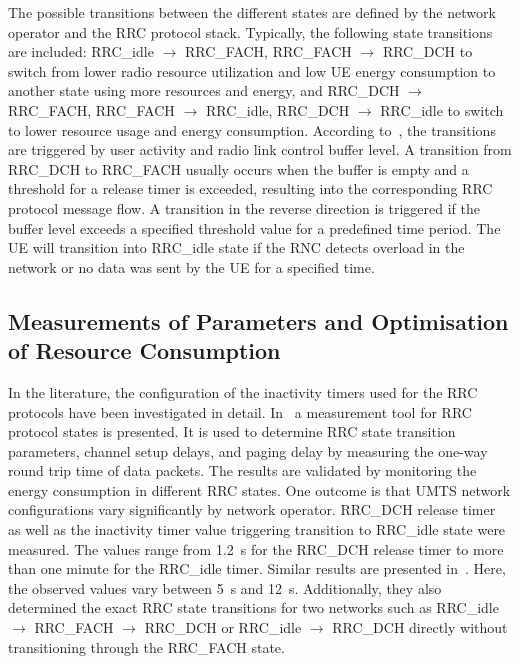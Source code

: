 The possible transitions between the different states are defined by the network operator and the \gls{RRC} protocol stack.
Typically, the following state transitions are included: 
\gls{RRC_idle} \(\rightarrow\) \gls{RRC_FACH},
\gls{RRC_FACH} \(\rightarrow\) \gls{RRC_DCH} to switch from lower radio resource utilization and low \gls{UE} energy consumption to another state using more resources and energy, and 
\gls{RRC_DCH} \(\rightarrow\) \gls{RRC_FACH}, 
\gls{RRC_FACH} \(\rightarrow\) \gls{RRC_idle},
\gls{RRC_DCH} \(\rightarrow\) \gls{RRC_idle} to switch to lower resource usage and energy consumption.
According to~\cite{Perala2009,Qian2010a}, the transitions are triggered by user activity and radio link control buffer level. 
A transition from \gls{RRC_DCH} to \gls{RRC_FACH} usually occurs when the buffer is empty and a threshold for a release timer is exceeded, resulting into the corresponding \gls{RRC} protocol message flow.
A transition in the reverse direction is triggered if the buffer level exceeds a specified threshold value for a predefined time period.
The \gls{UE} will transition into \gls{RRC_idle} state if the \gls{RNC} detects overload in the network or no data was sent by the \gls{UE} for a specified time.

\subsection{Measurements of  Parameters and Optimisation of Resource Consumption}\label{sec:network:background:measurement_optimisation}

In the literature, the configuration of the inactivity timers used for the \gls{RRC} protocols have been investigated in detail.
In~\cite{Perala2009} a measurement tool for \gls{RRC} protocol states is presented. 
It is used to determine \gls{RRC} state transition parameters, channel setup delays, and paging delay by measuring the one-way round trip time of data packets.
The results are validated by monitoring the energy consumption in different \gls{RRC} states.
One outcome is that \gls{UMTS} network configurations vary significantly by network operator.
\gls{RRC_DCH} release timer as well as the inactivity timer value triggering transition to \gls{RRC_idle} state were measured.
The values range from \SI{1.2}{\second} for the \gls{RRC_DCH} release timer to more than one minute for the \gls{RRC_idle} timer.
Similar results are presented in~\cite{Qian2010a}.
Here, the observed values vary between \SI{5}{\second} and \SI{12}{\second}. 
Additionally, they also determined the exact \gls{RRC} state transitions for two networks such as \gls{RRC_idle} \(\rightarrow\) \gls{RRC_FACH} \(\rightarrow\) \gls{RRC_DCH} or \gls{RRC_idle} \(\rightarrow\) \gls{RRC_DCH} directly without transitioning through the \gls{RRC_FACH} state.

